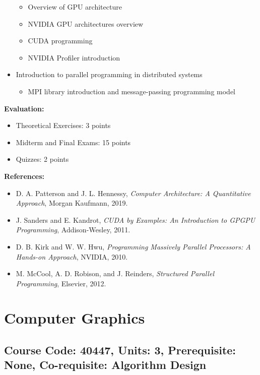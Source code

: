 \documentclass[12pt]{article}
\begin{document}
\begin{itemize}
    \begin{itemize}
        \item Overview of GPU architecture
        \item NVIDIA GPU architectures overview
        \item CUDA programming
        \item NVIDIA Profiler introduction
    \end{itemize}
    \item Introduction to parallel programming in distributed systems
    \begin{itemize}
        \item MPI library introduction and message-passing programming model
    \end{itemize}
\end{itemize}

\textbf{Evaluation:}
\begin{itemize}
    \item Theoretical Exercises: 3 points
    \item Midterm and Final Exams: 15 points
    \item Quizzes: 2 points
\end{itemize}

\textbf{References:}
\begin{itemize}
    \item D. A. Patterson and J. L. Hennessy, \textit{Computer Architecture: A Quantitative Approach}, Morgan Kaufmann, 2019.
    \item J. Sanders and E. Kandrot, \textit{CUDA by Examples: An Introduction to GPGPU Programming}, Addison-Wesley, 2011.
    \item D. B. Kirk and W. W. Hwu, \textit{Programming Massively Parallel Processors: A Hands-on Approach}, NVIDIA, 2010.
    \item M. McCool, A. D. Robison, and J. Reinders, \textit{Structured Parallel Programming}, Elsevier, 2012.
\end{itemize}

\newpage

\section{Computer Graphics}
\subsection*{Course Code: 40447, Units: 3, Prerequisite: None, Co-requisite: Algorithm Design}
\end{document}
